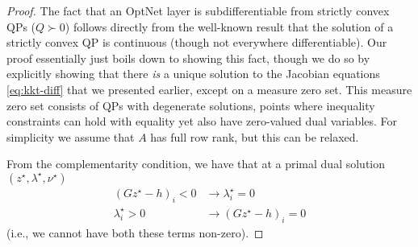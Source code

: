 \begin{proof}
  The fact that an OptNet layer is subdifferentiable from strictly convex QPs
  ($Q \succ 0$) follows directly from the well-known result that the solution of a
  strictly convex QP is continuous (though not everywhere differentiable).  Our
  proof essentially just boils down to showing this fact, though we do so by
  explicitly showing that there \emph{is} a unique solution to the Jacobian
  equations \eqref{eq:kkt-diff} that we presented earlier, except on a measure
  zero set.  This measure zero set consists of QPs with degenerate solutions,
  points where inequality constraints can hold with equality yet also have
  zero-valued dual variables.  For simplicity we assume that $A$ has full row
  rank, but this can be relaxed.

  From the complementarity condition, we have that at a primal dual solution
  $(z^\star, \lambda^\star, \nu^\star)$
  \begin{equation}
    \begin{split}
      (Gz^\star - h)_i < 0 & \rightarrow \lambda^\star_i = 0 \\
      \lambda^\star_i > 0 & \rightarrow (Gz^\star - h)_i = 0
    \end{split}
  \end{equation}
  (i.e., we cannot have both these terms non-zero).


\end{proof}
